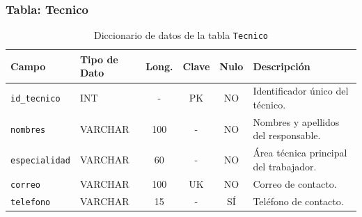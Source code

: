 \documentclass[11pt,a4paper]{article}
\begin{document}
\subsubsection{Tabla: Tecnico}
\begin{table}[H]
\centering
\small
\caption{Diccionario de datos de la tabla \texttt{Tecnico}}
\begin{tabular}{|l|l|c|c|c|p{5.1cm}|}
\hline
\textbf{Campo} & \textbf{Tipo de Dato} & \textbf{Long.} & \textbf{Clave} & \textbf{Nulo} & \textbf{Descripción} \\ \hline
\texttt{id\_tecnico} & INT & - & PK & NO & Identificador único del técnico. \\ \hline
\texttt{nombres} & VARCHAR & 100 & - & NO & Nombres y apellidos del responsable. \\ \hline
\texttt{especialidad} & VARCHAR & 60 & - & NO & Área técnica principal del trabajador. \\ \hline
\texttt{correo} & VARCHAR & 100 & UK & NO & Correo de contacto. \\ \hline
\texttt{telefono} & VARCHAR & 15 & - & SÍ & Teléfono de contacto. \\ \hline
\end{tabular}
\end{table}

\end{document}
